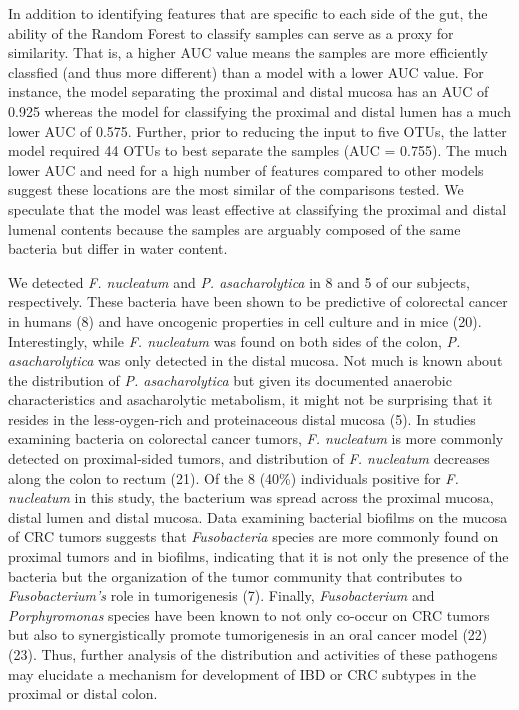 \documentclass[11pt,]{article}
\begin{document}
In addition to identifying features that are specific to each side of
the gut, the ability of the Random Forest to classify samples can serve
as a proxy for similarity. That is, a higher AUC value means the samples
are more efficiently classfied (and thus more different) than a model
with a lower AUC value. For instance, the model separating the proximal
and distal mucosa has an AUC of 0.925 whereas the model for classifying
the proximal and distal lumen has a much lower AUC of 0.575. Further,
prior to reducing the input to five OTUs, the latter model required 44
OTUs to best separate the samples (AUC = 0.755). The much lower AUC and
need for a high number of features compared to other models suggest
these locations are the most similar of the comparisons tested. We
speculate that the model was least effective at classifying the proximal
and distal lumenal contents because the samples are arguably composed of
the same bacteria but differ in water content.

We detected \emph{F. nucleatum} and \emph{P. asacharolytica} in 8 and 5
of our subjects, respectively. These bacteria have been shown to be
predictive of colorectal cancer in humans (8) and have oncogenic
properties in cell culture and in mice (20). Interestingly, while
\emph{F. nucleatum} was found on both sides of the colon, \emph{P.
asacharolytica} was only detected in the distal mucosa. Not much is
known about the distribution of \emph{P. asacharolytica} but given its
documented anaerobic characteristics and asacharolytic metabolism, it
might not be surprising that it resides in the less-oygen-rich and
proteinaceous distal mucosa (5). In studies examining bacteria on
colorectal cancer tumors, \emph{F. nucleatum} is more commonly detected
on proximal-sided tumors, and distribution of \emph{F. nucleatum}
decreases along the colon to rectum (21). Of the 8 (40\%) individuals
positive for \emph{F. nucleatum} in this study, the bacterium was spread
across the proximal mucosa, distal lumen and distal mucosa. Data
examining bacterial biofilms on the mucosa of CRC tumors suggests that
\emph{Fusobacteria} species are more commonly found on proximal tumors
and in biofilms, indicating that it is not only the presence of the
bacteria but the organization of the tumor community that contributes to
\emph{Fusobacterium's} role in tumorigenesis (7). Finally,
\emph{Fusobacterium} and \emph{Porphyromonas} species have been known to
not only co-occur on CRC tumors but also to synergistically promote
tumorigenesis in an oral cancer model (22) (23). Thus, further analysis
of the distribution and activities of these pathogens may elucidate a
mechanism for development of IBD or CRC subtypes in the proximal or
distal colon.
\end{document}
